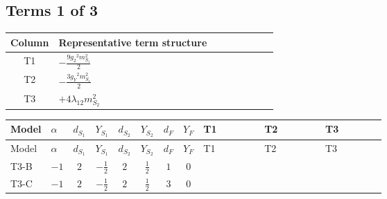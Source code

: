 \documentclass[8pt]{article}
\begin{document}
\begin{landscape}
\subsection*{Terms 1 of 3}
\begin{center}
\begin{tabular}{@{}c >{\raggedright\arraybackslash}p{0.82\linewidth}@{}}
\toprule
Column & Representative term structure \\
\midrule
T1 & \(\displaystyle -\frac{9 {g_2}^2 {m_{S_1}^2}}{2}\) \\
\midrule
T2 & \(\displaystyle -\frac{3 {g_Y}^2 {m_{S_1}^2}}{2}\) \\
\midrule
T3 & \(\displaystyle +4 {\lambda_{12}} {m_{S_2}^2}\) \\
\midrule
\bottomrule
\end{tabular}
\end{center}
\smallskip
\tiny
\begin{longtable}{@{}llcccccc >{\raggedright\arraybackslash}p{0.21\linewidth} >{\raggedright\arraybackslash}p{0.21\linewidth} >{\raggedright\arraybackslash}p{0.21\linewidth}@{}}
\toprule
Model & $\alpha$ & $d_{S_1}$ & $Y_{S_1}$ & $d_{S_2}$ & $Y_{S_2}$ & $d_F$ & $Y_F$ & T1 & T2 & T3 \\
\midrule
\endfirsthead
\toprule
Model & $\alpha$ & $d_{S_1}$ & $Y_{S_1}$ & $d_{S_2}$ & $Y_{S_2}$ & $d_F$ & $Y_F$ & T1 & T2 & T3 \\
\midrule
\endhead
T3-B & $-1$ & $2$ & $-\frac{1}{2}$ & $2$ & $\frac{1}{2}$ & $1$ & $0$ & \scriptsize\adjustbox{max width=\linewidth}{$\begin{gathered} -\frac{9 {g_2}^2 {m_{S_1}^2}}{2}\end{gathered}$} & \scriptsize\adjustbox{max width=\linewidth}{$\begin{gathered} -\frac{3 {g_Y}^2 {m_{S_1}^2}}{2}\end{gathered}$} & \scriptsize\adjustbox{max width=\linewidth}{$\begin{gathered} +4 {\lambda_{12}} {m_{S_2}^2}\end{gathered}$} \\
\midrule
T3-C & $-1$ & $2$ & $-\frac{1}{2}$ & $2$ & $\frac{1}{2}$ & $3$ & $0$ & \scriptsize\adjustbox{max width=\linewidth}{$\begin{gathered} -\frac{9 {g_2}^2 {m_{S_1}^2}}{2}\end{gathered}$} & \scriptsize\adjustbox{max width=\linewidth}{$\begin{gathered} -\frac{3 {g_Y}^2 {m_{S_1}^2}}{2}\end{gathered}$} & \scriptsize\adjustbox{max width=\linewidth}{$\begin{gathered} +4 {\lambda_{12}} {m_{S_2}^2}\end{gathered}$} \\

\end{longtable}
\end{landscape}
\end{document}
